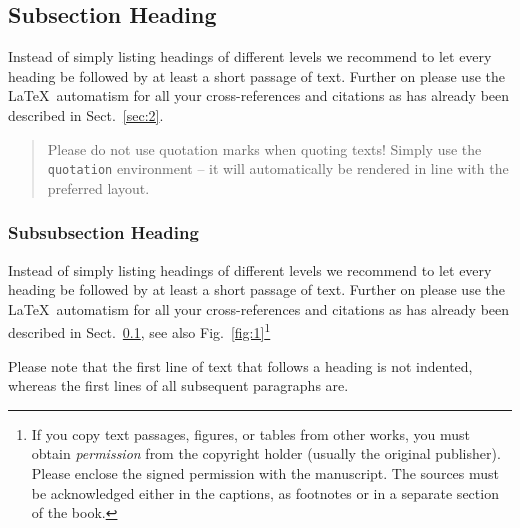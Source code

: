 \documentclass[graybox]{svmult}
\begin{document}
\subsection{Subsection Heading}
\label{subsec:2}
Instead of simply listing headings of different levels we recommend to let every heading be followed by at least a short passage of text.  Further on please use the \LaTeX\ automatism for all your cross-references and citations as has already been described in Sect.~\ref{sec:2}.

\begin{quotation}
Please do not use quotation marks when quoting texts! Simply use the \verb|quotation| environment -- it will automatically be rendered in line with the preferred layout.
\end{quotation}


\subsubsection{Subsubsection Heading}
Instead of simply listing headings of different levels we recommend to let every heading be followed by at least a short passage of text.  Further on please use the \LaTeX\ automatism for all your cross-references and citations as has already been described in Sect.~\ref{subsec:2}, see also Fig.~\ref{fig:1}\footnote{If you copy text passages, figures, or tables from other works, you must obtain \textit{permission} from the copyright holder (usually the original publisher). Please enclose the signed permission with the manuscript. The sources must be acknowledged either in the captions, as footnotes or in a separate section of the book.}

Please note that the first line of text that follows a heading is not indented, whereas the first lines of all subsequent paragraphs are.
\end{document}
